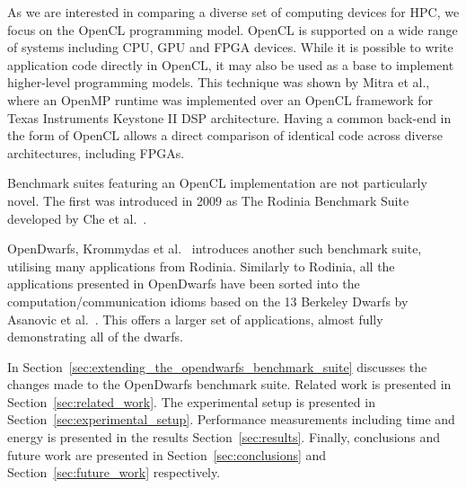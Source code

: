 \documentclass[../document.tex]{subfiles}
\begin{document}
As we are interested in comparing a diverse set of computing devices for HPC, we focus on the OpenCL programming model.
OpenCL is supported on a wide range of systems including CPU, GPU and FPGA devices.
While it is possible to write application code directly in OpenCL, it may also be used as a base to implement higher-level programming models.
This technique was shown by Mitra et al.,~\cite{mitra2014implementation} where an OpenMP runtime was implemented over an OpenCL framework for Texas Instruments Keystone II DSP architecture.
Having a common back-end in the form of OpenCL allows a direct comparison of identical code across diverse architectures, including FPGAs.

Benchmark suites featuring an OpenCL implementation are not particularly novel.
The first was introduced in 2009 as The Rodinia Benchmark Suite developed by Che et al.~\cite{che2009rodinia}.

OpenDwarfs, Krommydas et al.~\cite{krommydas2016opendwarfs} introduces another such benchmark suite, utilising many applications from Rodinia.
Similarly to Rodinia, all the applications presented in OpenDwarfs have been sorted into the computation/communication idioms based on the 13 Berkeley Dwarfs by Asanovic et al.~\cite{asanovic2006landscape}.
This offers a larger set of applications, almost fully demonstrating all of the dwarfs.

In Section~\ref{sec:extending_the_opendwarfs_benchmark_suite} discusses the changes made to the OpenDwarfs benchmark suite.
Related work is presented in Section~\ref{sec:related_work}.
The experimental setup is presented in Section~\ref{sec:experimental_setup}.
Performance measurements including time and energy is presented in the results Section~\ref{sec:results}.
Finally, conclusions and future work are presented in Section~\ref{sec:conclusions} and Section~\ref{sec:future_work} respectively.
\end{document}
